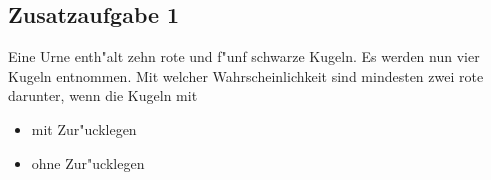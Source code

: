 \subsection*{Zusatzaufgabe 1}

Eine Urne enth"alt zehn rote und f"unf schwarze Kugeln. Es werden nun vier Kugeln entnommen. Mit welcher Wahrscheinlichkeit sind mindesten zwei rote darunter, wenn die Kugeln mit

\begin{itemize}
\item mit Zur"ucklegen
\item ohne Zur"ucklegen
\end{itemize}
